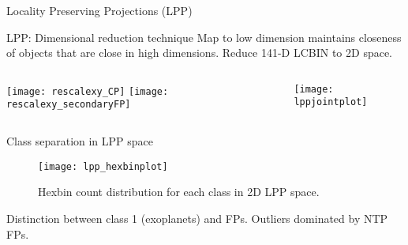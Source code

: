 \documentclass{beamer}
\begin{document}
\begin{frame}{Locality Preserving Projections (LPP)}
	\begin{block}{LPP: Dimensional reduction technique}
		Map to low dimension maintains closeness of objects that are close in high dimensions. Reduce 141-D LCBIN to 2D space.
	\end{block}
\begin{columns}
	\begin{column}{0.5\textwidth}
		\texttt{[image: rescalexy\_CP]} 
		\texttt{[image: rescalexy\_secondaryFP]} 
	\end{column} 
	\begin{column}{0.5\textwidth}  
		\texttt{[image: lppjointplot]}

	\end{column}  
\end{columns}

\end{frame}

\begin{frame}{Class separation in LPP space}
	\begin{figure}
	\texttt{[image: lpp\_hexbinplot]}
	\caption{Hexbin count distribution for each class in 2D LPP space.}
	
	\end{figure}
Distinction between class 1 (exoplanets) and FPs. Outliers dominated by NTP FPs.
\end{frame}
\end{document}
